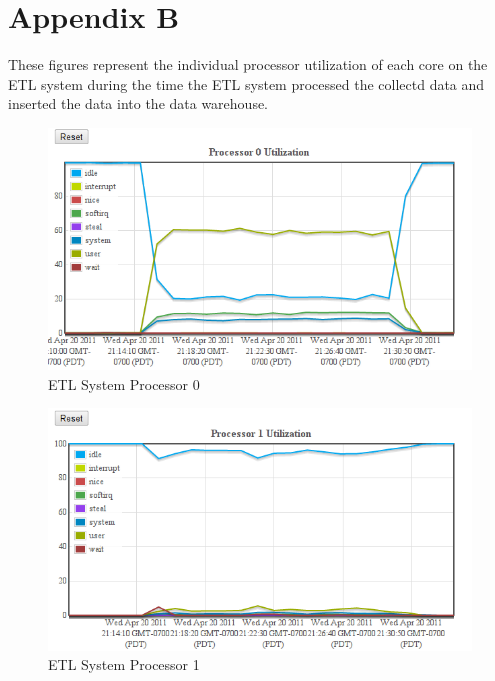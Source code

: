 \documentclass[twocolumn,letterpaper]{article}
\begin{document}
\section*{Appendix B}

These figures represent the individual processor utilization of each core on
the ETL system during the time the ETL system processed the collectd data and
inserted the data into the data warehouse.

\begin{figure}[ht]
  \begin{center}
    \includegraphics[scale=0.37]{etl-c10-cpu-00}
  \end{center}
  \caption{ETL System Processor 0}
  \label{etl-c10-cpu00}
\end{figure}

\begin{figure}[ht]
  \begin{center}
    \includegraphics[scale=0.37]{etl-c10-cpu-01}
  \end{center}
  \caption{ETL System Processor 1}
\end{figure}
\end{document}
